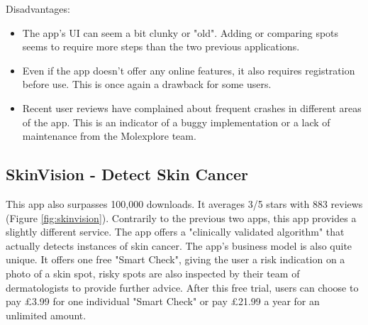 Disadvantages:
\begin{itemize}
    \item The app's UI can seem a bit clunky or "old". Adding or comparing spots seems to require more steps than the two previous applications.
    \item Even if the app doesn't offer any online features, it also requires registration before use. This is once again a drawback for some users.
    \item Recent user reviews have complained about frequent crashes in different areas of the app. This is an indicator of a buggy implementation or a lack of maintenance from the Molexplore team.
\end{itemize}

\subsection{SkinVision - Detect Skin Cancer}
This app also surpasses 100,000 downloads. It averages 3/5 stars with 883 reviews (Figure \ref{fig:skinvision}). Contrarily to the previous two apps, this app provides a slightly different service. The app offers a "clinically validated algorithm" that actually detects instances of skin cancer. The app's business model is also quite unique. It offers one free "Smart Check", giving the user a risk indication on a photo of a skin spot, risky spots are also inspected by their team of dermatologists to provide further advice. After this free trial, users can choose to pay \pounds3.99 for one individual "Smart Check" or pay \pounds21.99 a year for an unlimited amount.
